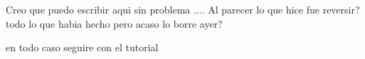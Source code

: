 Creo que puedo escribir aqui sin problema
....
Al parecer lo que hice fue reversir? todo lo que habia hecho
pero acaso lo borre ayer?

en todo caso seguire con el tutorial


